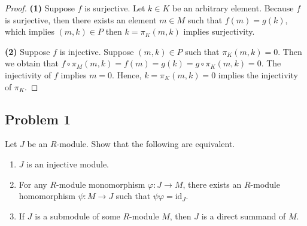 \begin{proof}
\textbf{(1)} Suppose $f$ is surjective. Let $k \in K$ be an arbitrary element.
Because $f$ is surjective, then there exists an element $m\in M$ such that $f(m)=g(k)$, which implies $(m,k)\in P$ then $k=\pi_{K}(m,k)$ implies surjectivity.


\textbf{(2)} Suppose $f$ is injective. Suppose $(m,k)\in P$ such that $\pi_K(m,k)=0$. 
 Then we obtain that $f\circ \pi_M(m,k) = f(m) =g(k)= g\circ \pi_K(m,k) = 0$. The injectivity of $f$ implies $m=0$. Hence, $k=\pi_{K}(m,k)=0$ implies the injectivity of $\pi_K$.
\end{proof}

\subsection*{Problem 1}
Let $J$ be an $R$-module. Show that the following are equivalent.
\begin{enumerate}
    \item[(1)] $J$ is an injective module.
    \item[(2)] For any $R$-module monomorphism $\varphi : J \to M$, there exists an $R$-module homomorphism $\psi : M \to J$ such that $\psi\varphi = \mathrm{id}_J$.
    \item[(3)] If $J$ is a submodule of some $R$-module $M$, then $J$ is a direct summand of $M$.
\end{enumerate}
